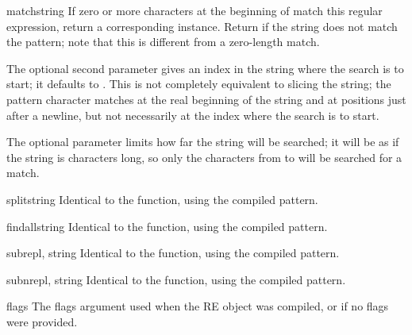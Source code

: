 \begin{methoddesc}[RegexObject]{match}{string}
  If zero or more characters at the beginning of  match
  this regular expression, return a corresponding
   instance.  Return  if the string does not
  match the pattern; note that this is different from a zero-length
  match.


  The optional second parameter  gives an index in the string
  where the search is to start; it defaults to .  This is not
  completely equivalent to slicing the string; the
   pattern
  character matches at the real beginning of the string and at positions
  just after a newline, but not necessarily at the index where the search
  is to start.

  The optional parameter  limits how far the string will
  be searched; it will be as if the string is  characters
  long, so only the characters from  to  will be
  searched for a match.
\end{methoddesc}

\begin{methoddesc}[RegexObject]{split}{string}
Identical to the  function, using the compiled pattern.
\end{methoddesc}

\begin{methoddesc}[RegexObject]{findall}{string}
Identical to the  function, using the compiled pattern.
\end{methoddesc}

\begin{methoddesc}[RegexObject]{sub}{repl, string}
Identical to the  function, using the compiled pattern.
\end{methoddesc}

\begin{methoddesc}[RegexObject]{subn}{repl, string}
Identical to the  function, using the compiled pattern.
\end{methoddesc}


\begin{memberdesc}[RegexObject]{flags}
The flags argument used when the RE object was compiled, or
 if no flags were provided.
\end{memberdesc}

